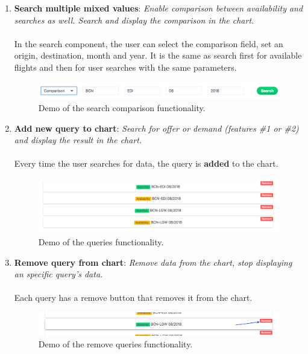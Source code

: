 \begin{enumerate}
    \item \textbf{Search multiple mixed values}: \textit{Enable comparison between availability and searches as well. Search and display the comparison in the chart.}
    \\\\
    In the search component, the user can select the comparison field, set an origin, destination, month and year. It is the same as search first for available flights and then for user searches with the same parameters.
    \begin{figure}[H]
    \centering
    \includegraphics[scale=0.35]{resources/search-comparison.png}
    \caption{Demo of the search comparison functionality.}
    \end{figure}

    \item \textbf{Add new query to chart}: \textit{Search for offer or demand (features \#1 or \#2) and display the result in the chart.}
    \\\\
    Every time the user searches for data, the query is \textbf{added} to the chart.
    \begin{figure}[H]
    \centering
    \includegraphics[scale=0.35]{resources/queries-list.png}
    \caption{Demo of the queries functionality.}
    \end{figure}

    \item \textbf{Remove query from chart}: \textit{Remove data from the chart, stop displaying an specific query's data.}
    \\\\
    Each query has a remove button that removes it from the chart.
    \begin{figure}[H]
    \centering
    \includegraphics[scale=0.35]{resources/queries-remove.png}
    \caption{Demo of the remove queries functionality.}
    \end{figure}

\end{enumerate}


